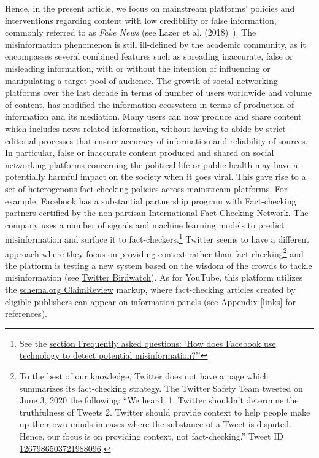 \documentclass{article}
\begin{document}
Hence, in the present article, we focus on mainstream platforms' policies and interventions regarding content with low credibility or false information, commonly referred to as {\it Fake News} (see Lazer et al. (2018)~\cite{lazer}). The misinformation phenomenon is still ill-defined by the academic community, as it encompasses several combined features such as spreading inaccurate, false or misleading information, with or without the intention of influencing or manipulating a target pool of audience.  The growth of social networking platforms over the last decade in terms of number of users worldwide and volume of content, has modified the information ecosystem in terms of production of information and its mediation. Many users can now produce and share content which includes news related information, without having to abide by strict editorial processes that ensure accuracy of information and reliability of sources. In particular, false or inaccurate content produced and shared on social networking platforms concerning the political life or public health may have a potentially harmful impact on the society when it goes viral. This gave rise to a set of heterogenous fact-checking policies across mainstream platforms. For example, Facebook has a substantial partnership program with Fact-checking partners certified by the non-partisan International Fact-Checking Network. The company uses a number of signals and machine learning models to predict misinformation and surface it to fact-checkers.\footnote{See the \href{https://www.facebook.com/journalismproject/programs/third-party-fact-checking/how-it-works}{section Frequently asked questions: `How does Facebook use technology to detect potential misinformation?''}} Twitter seems to have a different approach where they focus on providing context rather than fact-checking\footnote{To the best of our knowledge, Twitter does not have a page which summarizes its fact-checking strategy. The Twitter Safety Team tweeted on June 3, 2020 the following:  ``We heard: 1. Twitter shouldn’t determine the truthfulness of Tweets 2. Twitter should provide context to help people make up their own minds in cases where the substance of a Tweet is disputed. Hence, our focus is on providing context, not fact-checking.'' Tweet ID \href{https://twitter.com/TwitterSafety/status/1267986503721988096}{1267986503721988096}.} and the platform is testing a new system based on the wisdom of the crowds to tackle misinformation (see \href{https://blog.twitter.com/en\_us/topics/product/2021/introducing-birdwatch-a-community-based-approach-to-misinformation}{Twitter Birdwatch}). As for YouTube, this platform utilizes the \href{https://schema.org/ClaimReview}{schema.org ClaimReview} markup, where fact-checking articles created by eligible publishers can appear on information panels (see Appendix \ref{links} for references).
\end{document}
